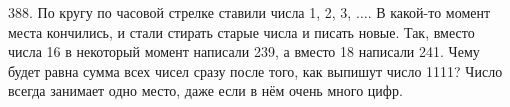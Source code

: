 388. По кругу по часовой стрелке ставили числа 1, 2, 3, $\ldots.$ В какой-то момент места кончились, и стали стирать старые числа и писать новые. Так, вместо числа 16 в некоторый момент написали 239, а вместо 18 написали 241. Чему будет равна сумма всех чисел сразу после того, как выпишут число 1111? Число всегда занимает одно место, даже если в нём очень много цифр.\\
